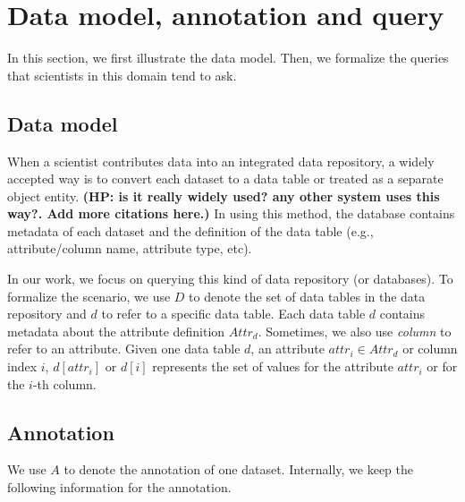 \section{Data model, annotation and query}\label{sec:dataquery}


In this section, we first illustrate the data model. Then, we
formalize the queries that scientists in this domain tend to ask. 

\subsection{Data model}\label{sec:datamodel}

When a scientist contributes data into an integrated data repository,
a widely accepted way is to convert each dataset to a data
table\cite{tdar} or treated as a separate object entity\cite{knb}. 
{\bf (HP: is it really widely used? any other system uses this
  way?. Add more citations here.)}
In using this method, the database contains metadata of each
dataset and the definition of the data table (e.g., attribute/column
name, attribute type, etc). 


In our work, we focus on querying this kind of data repository (or
databases). To formalize the scenario, we use $D$ to denote the set of data
tables in the data repository and $d$ to refer to a specific data
table. Each data table $d$ contains metadata about the attribute
definition $Attr_{d}$. Sometimes, we also use {\em column} to refer to an
attribute. 
Given one data table $d$, an attribute $attr_i \in Attr_{d}$ or column index $i$, 
$d[attr_i]$ or $d[i]$ represents the set of values for the attribute
$attr_i$ or for the $i$-th column.

\subsection{Annotation}\label{sec:annotation}



We use $A$ to denote the annotation of one dataset. 
Internally, we keep the following information for the
annotation. 

